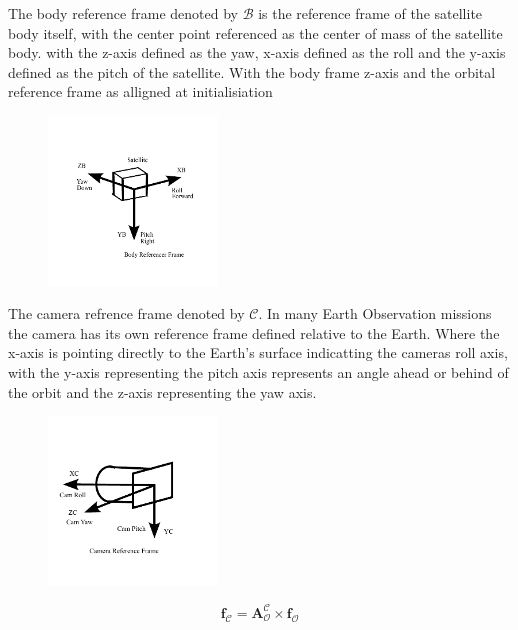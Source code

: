 The body reference frame denoted by $\mathcal{B}$ is the reference frame of the satellite body itself, with the center point referenced as the center of mass of the satellite body.
with the z-axis defined as the yaw, x-axis defined as the roll and the y-axis defined as the pitch of the satellite. With the body frame z-axis and the orbital reference frame 
as alligned at initialisiation


\begin{figure}[H]
    \centering
    \includegraphics[width=0.4\textwidth]{figures/modelling/BRF.pdf}
    \caption{}
    \label{fig:BRF}
\end{figure}


The camera refrence frame denoted by $\mathcal{C}$. In many Earth Observation missions the camera has its own reference frame defined relative to the Earth. Where the x-axis is
pointing directly to the Earth's surface indicatting the cameras roll axis, with the y-axis representing the pitch axis represents an angle ahead or behind of the orbit and the
z-axis representing the yaw axis.


\begin{figure}[H]
    \centering
    \includegraphics[width=0.4\textwidth]{figures/modelling/CRF.pdf}
    \caption{}
    \label{fig:CRF}
\end{figure}

\begin{equation}
    \mathbf{f}_{\mathcal{C}} = \mathbf{A}_{\mathcal{O}}^{\mathcal{C}}\times\mathbf{f}_{\mathcal{O}}
\end{equation}

